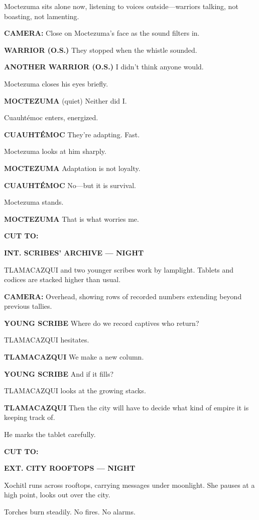 \documentclass[12pt]{article}
\begin{document}
Moctezuma sits alone now, listening to voices outside—warriors talking, not boasting, not lamenting.

\textbf{CAMERA:} Close on Moctezuma’s face as the sound filters in.

\textbf{WARRIOR (O.S.)}  
They stopped when the whistle sounded.

\textbf{ANOTHER WARRIOR (O.S.)}  
I didn’t think anyone would.

Moctezuma closes his eyes briefly.

\textbf{MOCTEZUMA}  
(quiet)  
Neither did I.

Cuauhtémoc enters, energized.

\textbf{CUAUHTÉMOC}  
They’re adapting.  
Fast.

Moctezuma looks at him sharply.

\textbf{MOCTEZUMA}  
Adaptation is not loyalty.

\textbf{CUAUHTÉMOC}  
No—but it is survival.

Moctezuma stands.

\textbf{MOCTEZUMA}  
That is what worries me.

\textbf{CUT TO:}

\textbf{INT. SCRIBES’ ARCHIVE — NIGHT}

TLAMACAZQUI and two younger scribes work by lamplight. Tablets and codices are stacked higher than usual.

\textbf{CAMERA:} Overhead, showing rows of recorded numbers extending beyond previous tallies.

\textbf{YOUNG SCRIBE}  
Where do we record captives who return?

TLAMACAZQUI hesitates.

\textbf{TLAMACAZQUI}  
We make a new column.

\textbf{YOUNG SCRIBE}  
And if it fills?

TLAMACAZQUI looks at the growing stacks.

\textbf{TLAMACAZQUI}  
Then the city will have to decide  
what kind of empire it is keeping track of.

He marks the tablet carefully.

\textbf{CUT TO:}

\textbf{EXT. CITY ROOFTOPS — NIGHT}

Xochitl runs across rooftops, carrying messages under moonlight. She pauses at a high point, looks out over the city.

Torches burn steadily. No fires. No alarms.
\end{document}
